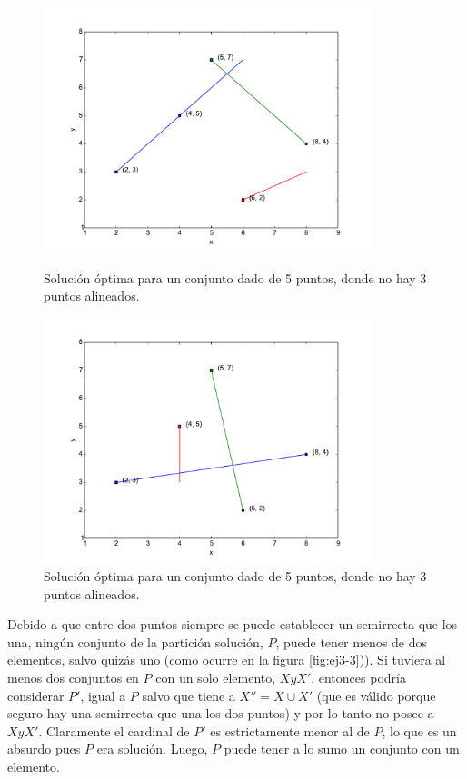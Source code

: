 \begin{figure}[H]
  \centering
  \begin{minipage}{0.49\textwidth}
  \includegraphics[width=0.85\textwidth]{img/ejemplos/ej3-3.pdf}
  \caption{\footnotesize Solución óptima para un conjunto dado de 5 puntos, donde no hay 3 puntos alineados.}
  \label{fig:ej3-3}
  \end{minipage}%
  \hspace{0.01\textwidth}
  \begin{minipage}{0.49\textwidth}
  \includegraphics[width=0.85\textwidth]{img/ejemplos/ej3-4.pdf}
  \caption{\footnotesize Solución óptima para un conjunto dado de 5 puntos, donde no hay 3 puntos alineados.}
  \label{fig:ej3-4}
  \end{minipage}%
\end{figure}

Debido a que entre dos puntos siempre se puede establecer un semirrecta que los una, ningún conjunto de la partición solución, $P$, puede tener menos de dos elementos, salvo quizás uno (como ocurre en la figura \ref{fig:ej3-3})). Si tuviera al menos dos conjuntos en $P$ con un solo elemento, $X y X'$, entonces podría considerar $P'$, igual a $P$ salvo que tiene a $X'' = X \cup X'$ (que es válido porque seguro hay una semirrecta que una los dos puntos) y por lo tanto no posee a $X y X'$. Claramente el cardinal de $P'$ es estrictamente menor al de $P$, lo que es un absurdo pues $P$ era solución. Luego, $P$ puede tener a lo sumo un conjunto con un elemento.


